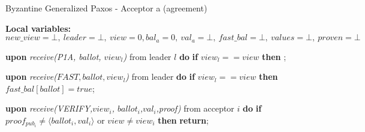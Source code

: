 \begin{algorithm} 
	\caption{Byzantine Generalized Paxos - Acceptor a (agreement)}
	\label{BFT-Acc}
	\textbf{Local variables:} $new\_view = \bot,\ leader = \bot,\ view = 0, bal_a = 0,\ val_a = \bot,\ fast\_bal = \bot,\ values=\bot,\ proven = \bot$
	\begin{algorithmic}[1]
		\State \textbf{upon} \textit{receive(P1A, ballot, $view_l$)} from leader $l$ \textbf{do}
		\State \hspace{\algorithmicindent} \textbf{if} $view_l == view$ \textbf{then}
		\State \hspace{\algorithmicindent}\hspace{\algorithmicindent} ;
		
		\State
		\State \textbf{upon} \textit{receive($FAST,ballot,view_l$)} from leader \textbf{do}
		\State \hspace{\algorithmicindent} \textbf{if} $view_l == view$ \textbf{then}
		\State \hspace{\algorithmicindent}\hspace{\algorithmicindent} $fast\_bal[ballot] = true$;
		
		\iffalse	\State
		\State \textbf{upon} \textit{receive(P2B,ballot,value,proof)} from acceptor $i$ \textbf{do}
		\State \hspace{\algorithmicindent} \textbf{if} $proof_{pub_i} \neq \langle ballot, value \rangle$ \textbf{then}
		\State \hspace{\algorithmicindent}\hspace{\algorithmicindent} \textbf{return};
		\State \hspace{\algorithmicindent} $checkpoint[ballot][i] = proof$;
		\State \hspace{\algorithmicindent} \textbf{if} $\#(checkpoint[ballot]) \geq N-f$ \textbf{then}
		\State \hspace{\algorithmicindent}\hspace{\algorithmicindent} $\Call{send}{P2B, ballot, value, checkpoint[ballot]}$ to learners;
		\State \hspace{\algorithmicindent}\hspace{\algorithmicindent} $val_a = \bot$;
		\fi
		\State
		\State \textbf{upon} \textit{receive(VERIFY,$view_i$, $ballot_i$,$val_i$,proof)} from acceptor $i$ \textbf{do}
		\State \hspace{\algorithmicindent} \textbf{if} $proof_{pub_i} \neq \langle ballot_i, val_i \rangle$ or $view \neq view_i$ \textbf{then}
		\State \hspace{\algorithmicindent}\hspace{\algorithmicindent} \textbf{return};
		\State
		

\end{algorithmic}
\end{algorithm}
